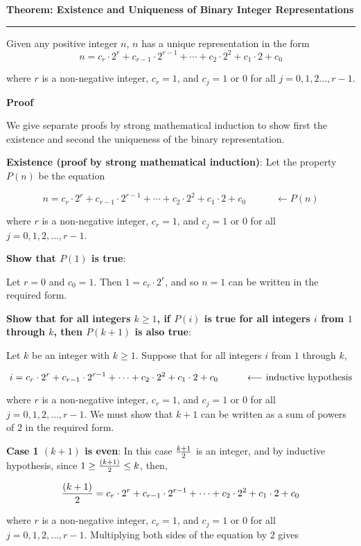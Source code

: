 \nopagenumbers
{\bf Theorem: Existence and Uniqueness of Binary Integer Representations}
\vskip 1mm
\hrule

\vskip 6pt
Given any positive integer $n$, $n$ has a unique representation in the form $$n=c_r \cdot 2^r+c_{r-1}\cdot 2^{r-1}+\cdots + c_2\cdot 2^2+c_1\cdot 2+c_0$$

where $r$ is a non-negative integer, $c_r=1$, and $c_j=1$ or $0$ for all $j=0,1,2\ldots ,r-1$.

\vskip 10pt
{\bf Proof}

\vskip 6pt
We give separate proofs by strong mathematical induction to show first the existence and second the uniqueness of the binary representation.

\vskip 1pt
{\bf Existence (proof by strong mathematical induction)}: Let the property $P(n)$ be the equation

$$n=c_r \cdot 2^r+c_{r-1}\cdot 2^{r-1}+\cdots + c_2\cdot 2^2+c_1\cdot 2+c_0 \quad\quad\quad \longleftarrow P(n)$$

where $r$ is a non-negative integer, $c_r=1$, and $c_j=1$ or $0$ for all $j=0,1,2,\ldots , r-1$.

\vskip 6pt
{\bf Show that $P(1)$ is true}:

\vskip 1mm
Let $r=0$ and $c_0=1$. Then $1=c_r\cdot 2^r$, and so $n=1$ can be written in the required form.

\vskip 10pt
{\bf Show that for all integers $k\geq 1$, if $P(i)$ is true for all integers $i$ from $1$ through $k$, then $P(k+1)$ is also true}:

\vskip 1mm
Let $k$ be an integer with $k\geq 1$. Suppose that for all integers $i$ from $1$ through $k$,

$$i=c_r \cdot 2^r+c_{r-1}\cdot 2^{r-1}+\cdots + c_2\cdot 2^2+c_1\cdot 2+c_0\quad\quad\quad\hbox{$\longleftarrow$ inductive hypothesis}$$

where $r$ is a non-negative integer, $c_r=1$, and $c_j=1$ or $0$ for all $j=0,1,2,\ldots , r-1$. We must show that $k+1$ can be written as a sum of powers of $2$ in the required form.

\vskip 6pt
{\bf Case 1 $(k+1)$ is even}: In this case ${k+1}\over 2$ is an integer, and by inductive hypothesis, since $1\geq {(k+1)\over 2}\leq k$, then,

$${(k+1)\over 2}=c_r \cdot 2^r+c_{r-1}\cdot 2^{r-1}+\cdots + c_2\cdot 2^2+c_1\cdot 2+c_0$$

where $r$ is a non-negative integer, $c_r=1$, and $c_j=1$ or $0$ for all $j=0,1,2,\ldots , r-1$. Multiplying both sides of the equation by $2$ gives

